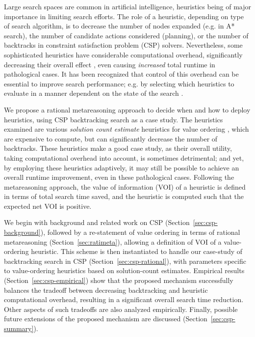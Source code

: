 

Large search spaces are common in artificial intelligence, heuristics
being of major importance in limiting search efforts.  The role of a
heuristic, depending on type of search algorithm, is to decrease the
number of nodes expanded (e.g. in A* search), the number of candidate
actions considered (planning), or the number of backtracks in
constraint satisfaction problem (CSP) solvers.  Nevertheless, some
sophisticated heuristics have considerable computational overhead,
significantly decreasing their overall effect
\cite{HorschHavens.pac,Kask.solcount}, even causing {\em increased}
total runtime in pathological cases.  It has been recognized that
control of this overhead can be essential to improve search
performance; e.g. by selecting which heuristics to evaluate in a
manner dependent on the state of the search
\cite{Wallace.macheur,Domshlak.maxornot}.

We propose a rational metareasoning approach to
decide when and how to deploy heuristics, using CSP backtracking
search as a case study.  The heuristics examined are various {\em
  solution count estimate} heuristics for value ordering
\cite{Meisels.solcount,HorschHavens.pac}, which are expensive to
compute, but can significantly decrease the number of
backtracks. These heuristics make a good case study, as their overall
utility, taking computational overhead into account, is sometimes
detrimental; and yet, by employing these heuristics adaptively, it may
still be possible to achieve an overall runtime improvement, even in
these pathological cases.  Following the metareasoning approach, the
value of information (VOI) of a heuristic is defined in terms of total
search time saved, and the heuristic is computed such that the
expected net VOI is positive.

We begin with background and related work on CSP
(Section~\ref{sec:csp-background}), followed by a re-statement of
value ordering in terms of rational metareasoning
(Section~\ref{sec:ratimeta}), allowing a definition of VOI of a
value-ordering heuristic.  This scheme is then instantiated to handle
our case-study of backtracking search in CSP
(Section~\ref{sec:csp-rational}), with parameters specific to
value-ordering heuristics based on solution-count estimates.
Empirical results (Section~\ref{sec:csp-empirical}) show that the
proposed mechanism successfully balances the tradeoff between
decreasing backtracking and heuristic computational overhead,
resulting in a significant overall search time reduction.  Other
aspects of such tradeoffs are also analyzed empirically.  Finally,
possible future extensions of the proposed mechanism are discussed
(Section~\ref{sec:csp-summary}).


